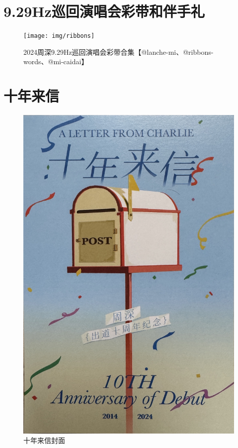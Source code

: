 \documentclass[]{ctexbook}
\begin{document}
\chapter{9.29Hz巡回演唱会彩带和伴手礼}\label{appendix-gift}

\begin{figure}

{\centering \texttt{[image: img/ribbons]} 

}

\caption{2024周深9.29Hz巡回演唱会彩带合集【@lanche-mi、@ribbons-words、@mi-caidai】}\label{fig:unnamed-chunk-147}
\end{figure}

\chapter{十年来信}\label{appendix-letter}

\begin{figure}

{\centering \includegraphics[width=340pt]{img/letter-cover} 

}

\caption{十年来信封面}\label{fig:unnamed-chunk-149}
\end{figure}
\end{document}
